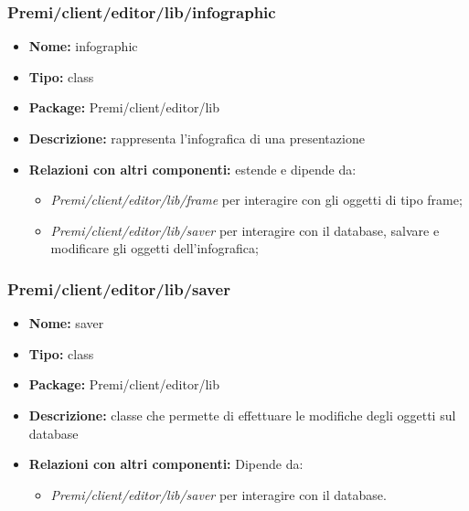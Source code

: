 \subsubsection{Premi/client/editor/lib/infographic}
\begin{itemize}
  \item[] \textbf{Nome:} infographic
  \item[] \textbf{Tipo:} class
  \item[] \textbf{Package:} Premi/client/editor/lib
  \item[] \textbf{Descrizione:} rappresenta l'infografica di una presentazione
  \item[] \textbf{Relazioni con altri componenti:} estende  e dipende da:
\begin{itemize} 
	\item \textit{Premi/client/editor/lib/frame} per interagire con gli oggetti di tipo frame;
	\item \textit{Premi/client/editor/lib/saver} per interagire con il database, salvare e modificare gli oggetti dell'infografica;
\end{itemize}  
\end{itemize}
\subsubsection{Premi/client/editor/lib/saver}
\begin{itemize}
  \item[] \textbf{Nome:} saver
  \item[] \textbf{Tipo:} class
  \item[] \textbf{Package:} Premi/client/editor/lib
  \item[] \textbf{Descrizione:} classe che permette di effettuare le modifiche degli oggetti sul database
  \item[] \textbf{Relazioni con altri componenti:} Dipende da:
\begin{itemize} 
	\item \textit{Premi/client/editor/lib/saver} per interagire con il database.
\end{itemize}  
\end{itemize}



